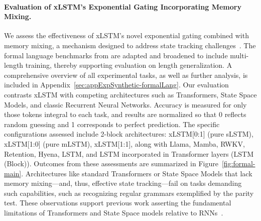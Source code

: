 \paragraph{Evaluation of xLSTM’s Exponential Gating Incorporating Memory Mixing.} We assess the effectiveness of xLSTM’s novel exponential gating combined with memory mixing, a mechanism designed to address state tracking challenges~\citep{Merrill:24, Merrill:23}. The formal language benchmarks from \citet{Deletang:23} are adapted and broadened to include multi-length training, thereby supporting evaluation on length generalization. A comprehensive overview of all experimental tasks, as well as further analysis, is included in Appendix~\ref{sec:appExpSynthetic-formalLang}. Our evaluation contrasts xLSTM with competing architectures such as Transformers, State Space Models, and classic Recurrent Neural Networks. Accuracy is measured for only those tokens integral to each task, and results are normalized so that 0 reflects random guessing and 1 corresponds to perfect prediction. The specific configurations assessed include 2-block architectures: xLSTM[0:1] (pure sLSTM), xLSTM[1:0] (pure mLSTM), xLSTM[1:1], along with Llama, Mamba, RWKV, Retention, Hyena, LSTM, and LSTM incorporated in Transformer layers (LSTM (Block)). Outcomes from these assessments are summarized in Figure~\ref{fig:formal-main}. Architectures like standard Transformers or State Space Models that lack memory mixing—and, thus, effective state tracking—fail on tasks demanding such capabilities, such as recognizing regular grammars exemplified by the parity test. These observations support previous work asserting the fundamental limitations of Transformers and State Space models relative to RNNs~\citep{Merrill:24, Merrill:23, Deletang:23}.

